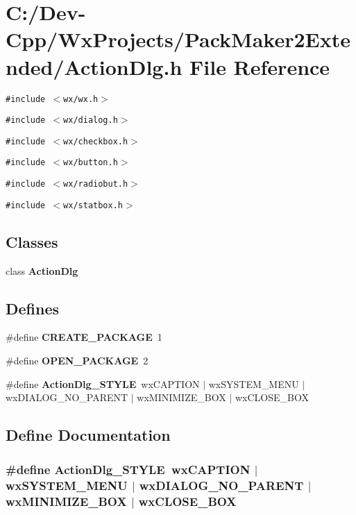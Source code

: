 \section{C:/Dev-Cpp/Wx\-Projects/Pack\-Maker2Extended/Action\-Dlg.h File Reference}
\label{_action_dlg_8h}
{\tt \#include $<$wx/wx.h$>$}\par
{\tt \#include $<$wx/dialog.h$>$}\par
{\tt \#include $<$wx/checkbox.h$>$}\par
{\tt \#include $<$wx/button.h$>$}\par
{\tt \#include $<$wx/radiobut.h$>$}\par
{\tt \#include $<$wx/statbox.h$>$}\par
\subsection*{Classes}
\begin{CompactItemize}
\item 
class {\bf Action\-Dlg}
\end{CompactItemize}
\subsection*{Defines}
\begin{CompactItemize}
\item 
\#define {\bf CREATE\_\-PACKAGE}~1
\item 
\#define {\bf OPEN\_\-PACKAGE}~2
\item 
\#define {\bf Action\-Dlg\_\-STYLE}~wx\-CAPTION $|$ wx\-SYSTEM\_\-MENU $|$ wx\-DIALOG\_\-NO\_\-PARENT $|$ wx\-MINIMIZE\_\-BOX $|$ wx\-CLOSE\_\-BOX
\end{CompactItemize}


\subsection{Define Documentation}
\subsubsection{\setlength{\rightskip}{0pt plus 5cm}\#define Action\-Dlg\_\-STYLE~wx\-CAPTION $|$ wx\-SYSTEM\_\-MENU $|$ wx\-DIALOG\_\-NO\_\-PARENT $|$ wx\-MINIMIZE\_\-BOX $|$ wx\-CLOSE\_\-BOX}\label{_action_dlg_8h_a7fca2fe8e5fa0d88091f97255eaad54}




